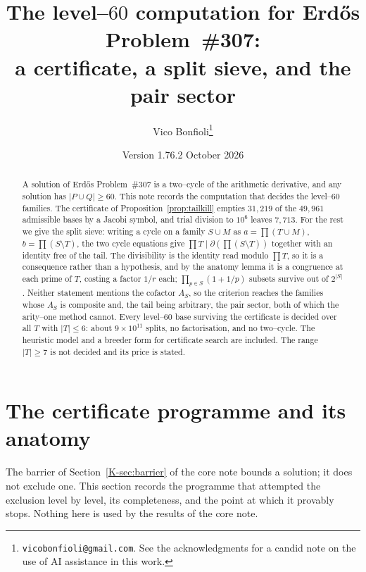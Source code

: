 \documentclass[11pt]{article}
\title{The level--$60$ computation for Erd\H{o}s Problem~\#307:\\ a certificate, a split sieve, and the pair sector}
\author{Vico Bonfioli\thanks{\texttt{vicobonfioli@gmail.com}.
  See the acknowledgments for a candid note on the use of AI assistance in this work.}}
\date{Version 1.76.2\quad 18 October 2026}
\theoremstyle{definition}
\begin{document}
\maketitle

\begin{abstract}
A solution of Erd\H{o}s Problem~\#307 is a two--cycle of the arithmetic derivative, and any solution
has $|P\cup Q|\ge60$. This note records the computation that decides the level--$60$ families.
The certificate of Proposition~\ref{prop:tailkill} empties $31{,}219$ of the $49{,}961$ admissible
bases by a Jacobi symbol, and trial division to $10^{6}$ leaves $7{,}713$. For the rest we give the
split sieve: writing a cycle on a family $S\cup M$ as $a=\prod(T\cup M)$, $b=\prod(S\setminus T)$,
the two cycle equations give $\prod T\mid\partial(\prod(S\setminus T))$ together with an identity
free of the tail. The divisibility is the identity read modulo $\prod T$, so it is a consequence
rather than a hypothesis, and by the anatomy lemma it is a congruence at each prime of $T$, costing
a factor $1/r$ each; $\prod_{p\in S}(1+1/p)$ subsets survive out of $2^{|S|}$. Neither statement
mentions the cofactor $A_S$, so the criterion reaches the families whose $A_S$ is composite and, the
tail being arbitrary, the pair sector, both of which the arity--one method cannot. Every level--$60$
base surviving the certificate is decided over all $T$ with $|T|\le6$: about $9\times10^{11}$ splits,
no factorisation, and no two--cycle. The heuristic model and a breeder form for certificate search
are included. The range $|T|\ge7$ is not decided and its price is stated.
\end{abstract}
\section{The certificate programme and its anatomy}\label{sec:certificate}

The barrier of Section~\ref{K-sec:barrier} of the core note bounds a solution; it does not exclude one. This section
records the programme that attempted the exclusion level by level, its completeness, and the point
at which it provably stops. Nothing here is used by the results of the core note.
\end{document}
